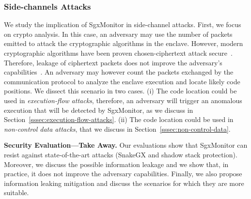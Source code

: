 \subsubsection{Side-channels Attacks}
\label{sssec:info-leakage}

We study the implication of SgxMonitor in side-channel attacks.
First, we focus on crypto analysis. In this case, an adversary may use the 
number of packets emitted to attack the cryptographic algorithms in the 
enclave. However, 
modern cryptographic algorithms have been proven chosen-ciphertext attack 
secure~\citep{barthe2011beyond}. Therefore, leakage of ciphertext packets does 
not improve the adversary's capabilities~\citep{wee2010efficient}. 
%
An adversary may however count the packets exchanged by the communication 
protocol to analyze the enclave execution and locate likely code
positions. 
We dissect this scenario in two cases.
(i) The code location could be used in \emph{execution-flow attacks}, 
therefore, an adversary will trigger an anomalous execution that will be 
detected by SgxMonitor, as we discuss in 
Section~\ref{sssec:execution-flow-attacks}.
(ii) The code location could be used in \emph{non-control data attacks}, that 
we discuss in Section~\ref{sssec:non-control-data}.

\vspace{0.5cm}
\noindent \textbf{Security Evaluation---Take Away.}
Our evaluations show that SgxMonitor can resist against state-of-the-art 
attacks (\ie \textsf{SnakeGX} and shadow stack protection).
Moreover, we discuss the possible information leakage and we show that, in 
practice, it does not improve the adversary capabilities.
Finally, we also propose information leaking mitigation and discuss the 
scenarios for which they are more suitable.